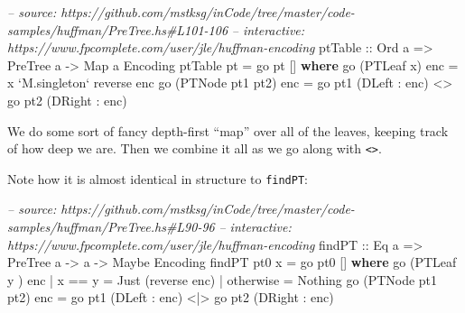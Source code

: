 \documentclass[]{article}
\newenvironment{Shaded}{\begin{snugshade}}{\end{snugshade}}
\newcommand{\CommentTok}[1]{\textcolor[rgb]{0.56,0.35,0.01}{\textit{#1}}}
\newcommand{\DataTypeTok}[1]{\textcolor[rgb]{0.13,0.29,0.53}{#1}}
\newcommand{\FunctionTok}[1]{\textcolor[rgb]{0.00,0.00,0.00}{#1}}
\newcommand{\KeywordTok}[1]{\textcolor[rgb]{0.13,0.29,0.53}{\textbf{#1}}}
\newcommand{\NormalTok}[1]{#1}
\newcommand{\OtherTok}[1]{\textcolor[rgb]{0.56,0.35,0.01}{#1}}
\begin{document}
\begin{Shaded}
\begin{Highlighting}[]
\CommentTok{-- source: https://github.com/mstksg/inCode/tree/master/code-samples/huffman/PreTree.hs#L101-106}
\CommentTok{-- interactive: https://www.fpcomplete.com/user/jle/huffman-encoding}
\OtherTok{ptTable ::} \DataTypeTok{Ord}\NormalTok{ a }\OtherTok{=>} \DataTypeTok{PreTree}\NormalTok{ a }\OtherTok{->} \DataTypeTok{Map}\NormalTok{ a }\DataTypeTok{Encoding}
\NormalTok{ptTable pt }\FunctionTok{=}\NormalTok{ go pt []}
  \KeywordTok{where}
\NormalTok{    go (}\DataTypeTok{PTLeaf}\NormalTok{ x) enc       }\FunctionTok{=}\NormalTok{ x }\OtherTok{`M.singleton`}\NormalTok{ reverse enc}
\NormalTok{    go (}\DataTypeTok{PTNode}\NormalTok{ pt1 pt2) enc }\FunctionTok{=}\NormalTok{ go pt1 (}\DataTypeTok{DLeft}  \FunctionTok{:}\NormalTok{ enc) }\FunctionTok{<>}
\NormalTok{                              go pt2 (}\DataTypeTok{DRight} \FunctionTok{:}\NormalTok{ enc)}
\end{Highlighting}
\end{Shaded}

We do some sort of fancy depth-first ``map'' over all of the leaves, keeping
track of how deep we are. Then we combine it all as we go along with
\texttt{\textless{}\textgreater{}}.

Note how it is almost identical in structure to \texttt{findPT}:

\begin{Shaded}
\begin{Highlighting}[]
\CommentTok{-- source: https://github.com/mstksg/inCode/tree/master/code-samples/huffman/PreTree.hs#L90-96}
\CommentTok{-- interactive: https://www.fpcomplete.com/user/jle/huffman-encoding}
\OtherTok{findPT ::} \DataTypeTok{Eq}\NormalTok{ a }\OtherTok{=>} \DataTypeTok{PreTree}\NormalTok{ a }\OtherTok{->}\NormalTok{ a }\OtherTok{->} \DataTypeTok{Maybe} \DataTypeTok{Encoding}
\NormalTok{findPT pt0 x }\FunctionTok{=}\NormalTok{ go pt0 []}
  \KeywordTok{where}
\NormalTok{    go (}\DataTypeTok{PTLeaf}\NormalTok{ y      ) enc }\FunctionTok{|}\NormalTok{ x }\FunctionTok{==}\NormalTok{ y    }\FunctionTok{=} \DataTypeTok{Just}\NormalTok{ (reverse enc)}
                            \FunctionTok{|}\NormalTok{ otherwise }\FunctionTok{=} \DataTypeTok{Nothing}
\NormalTok{    go (}\DataTypeTok{PTNode}\NormalTok{ pt1 pt2) enc }\FunctionTok{=}\NormalTok{ go pt1 (}\DataTypeTok{DLeft}  \FunctionTok{:}\NormalTok{ enc) }\FunctionTok{<|>}
\NormalTok{                              go pt2 (}\DataTypeTok{DRight} \FunctionTok{:}\NormalTok{ enc)}
\end{Highlighting}
\end{Shaded}
\end{document}
